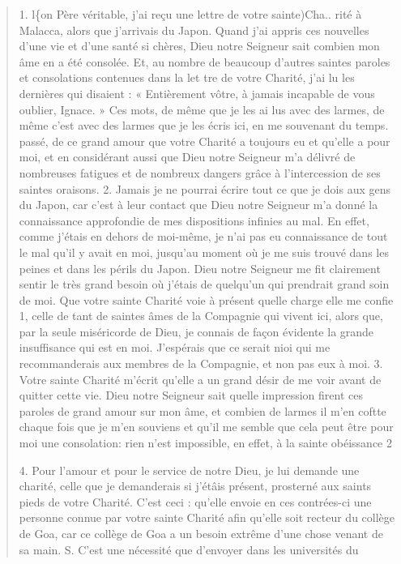 \begin{quote}
    1. l\{on Père véritable, j'ai reçu une lettre de votre sainte)Cha..
rité à Malacca, alors que j'arrivais du Japon. Quand j'ai appris
ces nouvelles d'une vie et d'une santé si chères, Dieu notre Seigneur
sait combien mon âme en a été consolée. Et, au nombre de beaucoup
d'autres saintes paroles et consolations contenues dans la let
tre de votre Charité, j'ai lu les dernières qui disaient : « Entièrement
vôtre, à jamais incapable de vous oublier, Ignace. » Ces
mots, de même que je les ai lus avec des larmes, de même c'est avec
des larmes que je les écris ici, en me souvenant du temps. passé,
de ce grand amour que votre Charité a toujours eu et qu'elle a pour
moi, et en considérant aussi que Dieu notre Seigneur m'a délivré
de nombreuses fatigues et de nombreux dangers grâce à l'intercession
de ses saintes oraisons.
2. Jamais je ne pourrai écrire tout ce que je dois aux gens du
Japon, car c'est à leur contact que Dieu notre Seigneur m'a donné
la connaissance approfondie de mes dispositions infinies au mal.
En effet, comme j'étais en dehors de moi-même, je n'ai pas eu
connaissance de tout le mal qu'il y avait en moi, jusqu'au moment
où je me suis trouvé dans les peines et dans les périls du Japon.
Dieu notre Seigneur me fit clairement sentir le très grand besoin
où j'étais de quelqu'un qui prendrait grand soin de moi. Que votre
sainte Charité voie à présent quelle charge elle me confie 1, celle
de tant de saintes âmes de la Compagnie qui vivent ici, alors que,
par la seule miséricorde de Dieu, je connais de façon évidente la
grande insuffisance qui est en moi. J'espérais que ce serait nioi qui
me recommanderais aux membres de la Compagnie, et non pas eux
à moi.
3. Votre sainte Charité m'écrit qu'elle a un grand désir de me
voir avant de quitter cette vie. Dieu notre Seigneur sait quelle
impression firent ces paroles de grand amour sur mon âme, et
combien de larmes il m'en coftte chaque fois que je m'en souviens
et qu'il me semble que cela peut être pour moi une consolation:
rien n'est impossible, en effet, à la sainte obéissance 2

4. Pour l'amour et pour le service de notre Dieu, je lui demande
une charité, celle que je demanderais si j'étâis présent, prosterné
aux saints pieds de votre Charité. C'est ceci : qu'elle envoie en ces
contrées-ci une personne connue par votre sainte Charité afin
qu'elle soit recteur du collège de Goa, car ce collège de Goa a un
besoin extrême d'une chose venant de sa main.
S. C'est une nécessité que d'envoyer dans les universités du
\end{quote}

